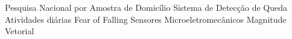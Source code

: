 \begin{acronym}[ACRONYM] 

 { Pesquisa Nacional por Amostra de Domicílio }
 {Sistema de Detecção de Queda}
 {Atividades diárias}
 {Fear of Falling}
 { Sensores Microeletromecânicos }
 { Magnitude Vetorial }
    
\end{acronym}